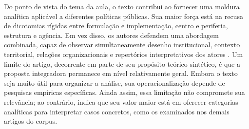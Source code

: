 \documentclass[12pt,a4paper]{article}
\begin{document}
Do ponto de vista do tema da aula, o texto contribui ao fornecer uma moldura analítica aplicável a diferentes políticas públicas. Sua maior força está na recusa de dicotomias rígidas entre formulação e implementação, centro e periferia, estrutura e agência. Em vez disso, os autores defendem uma abordagem combinada, capaz de observar simultaneamente desenho institucional, contexto territorial, relações organizacionais e repertórios interpretativos dos atores \autocite{dascenzi2013_implementacao_de}.
Um limite do artigo, decorrente em parte de seu propósito teórico-sintético, é que a proposta integradora permanece em nível relativamente geral. Embora o texto seja muito útil para organizar a análise, sua operacionalização depende de pesquisas empíricas específicas. Ainda assim, essa limitação não compromete sua relevância; ao contrário, indica que seu valor maior está em oferecer categorias analíticas para interpretar casos concretos, como os examinados nos demais artigos do corpus.
\end{document}
